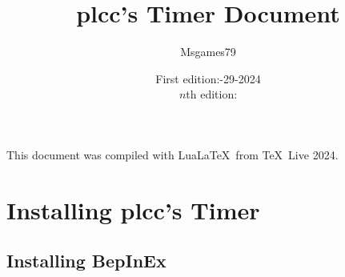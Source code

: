 \documentclass[lualatex,a4paper,fontsize=11pt,jafontscale=0.9247,titlepage,oneside]{jlreq}
\begin{document}
\title{plcc's Timer Document}
\author{Msgames79}
\date{First edition:-29-2024\\$n$th edition:\;\todayen}
\maketitle
This document was compiled with Lua\LaTeX\ from \TeX\ Live 2024.
\tableofcontents
\clearpage
\section{Installing plcc's Timer}
\subsection{Installing BepInEx}
\end{document}
